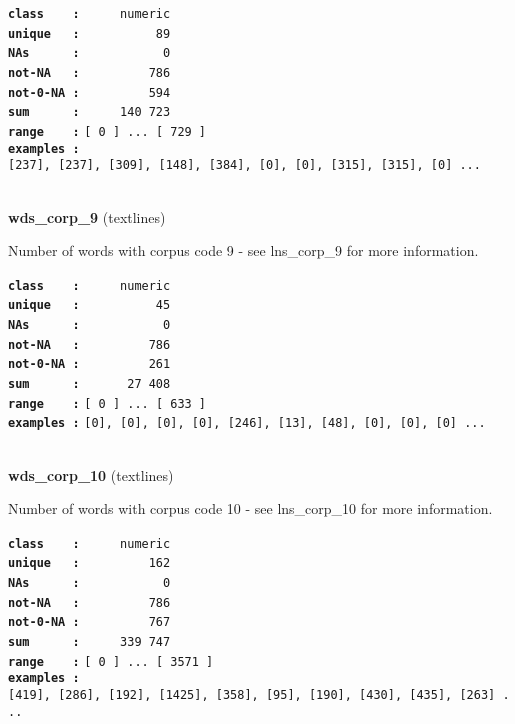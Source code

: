 \documentclass[]{article}
\begin{document}
\textbf{\texttt{class\ \ \ \ :}} \texttt{~~~~~numeric}\\
\textbf{\texttt{unique\ \ \ :}} \texttt{~~~~~~~~~~89}\\
\textbf{\texttt{NAs\ \ \ \ \ \ :}} \texttt{~~~~~~~~~~~0}\\
\textbf{\texttt{not-NA\ \ \ :}} \texttt{~~~~~~~~~786}\\
\textbf{\texttt{not-0-NA\ :}} \texttt{~~~~~~~~~594}\\
\textbf{\texttt{sum\ \ \ \ \ \ :}} \texttt{~~~~~140~723}\\
\textbf{\texttt{range\ \ \ \ :}}
\texttt{{[}\ 0\ {]}\ ...\ {[}\ 729\ {]}}\\
\textbf{\texttt{examples\ :}}
\texttt{{[}237{]},\ {[}237{]},\ {[}309{]},\ {[}148{]},\ {[}384{]},\ {[}0{]},\ {[}0{]},\ {[}315{]},\ {[}315{]},\ {[}0{]}\ ...}\\

~

\textbf{wds\_corp\_9} (textlines)

Number of words with corpus code 9 - see lns\_corp\_9 for more
information.

\textbf{\texttt{class\ \ \ \ :}} \texttt{~~~~~numeric}\\
\textbf{\texttt{unique\ \ \ :}} \texttt{~~~~~~~~~~45}\\
\textbf{\texttt{NAs\ \ \ \ \ \ :}} \texttt{~~~~~~~~~~~0}\\
\textbf{\texttt{not-NA\ \ \ :}} \texttt{~~~~~~~~~786}\\
\textbf{\texttt{not-0-NA\ :}} \texttt{~~~~~~~~~261}\\
\textbf{\texttt{sum\ \ \ \ \ \ :}} \texttt{~~~~~~27~408}\\
\textbf{\texttt{range\ \ \ \ :}}
\texttt{{[}\ 0\ {]}\ ...\ {[}\ 633\ {]}}\\
\textbf{\texttt{examples\ :}}
\texttt{{[}0{]},\ {[}0{]},\ {[}0{]},\ {[}0{]},\ {[}246{]},\ {[}13{]},\ {[}48{]},\ {[}0{]},\ {[}0{]},\ {[}0{]}\ ...}\\

~

\textbf{wds\_corp\_10} (textlines)

Number of words with corpus code 10 - see lns\_corp\_10 for more
information.

\textbf{\texttt{class\ \ \ \ :}} \texttt{~~~~~numeric}\\
\textbf{\texttt{unique\ \ \ :}} \texttt{~~~~~~~~~162}\\
\textbf{\texttt{NAs\ \ \ \ \ \ :}} \texttt{~~~~~~~~~~~0}\\
\textbf{\texttt{not-NA\ \ \ :}} \texttt{~~~~~~~~~786}\\
\textbf{\texttt{not-0-NA\ :}} \texttt{~~~~~~~~~767}\\
\textbf{\texttt{sum\ \ \ \ \ \ :}} \texttt{~~~~~339~747}\\
\textbf{\texttt{range\ \ \ \ :}}
\texttt{{[}\ 0\ {]}\ ...\ {[}\ 3571\ {]}}\\
\textbf{\texttt{examples\ :}}
\texttt{{[}419{]},\ {[}286{]},\ {[}192{]},\ {[}1425{]},\ {[}358{]},\ {[}95{]},\ {[}190{]},\ {[}430{]},\ {[}435{]},\ {[}263{]}\ ...}\\
\end{document}
